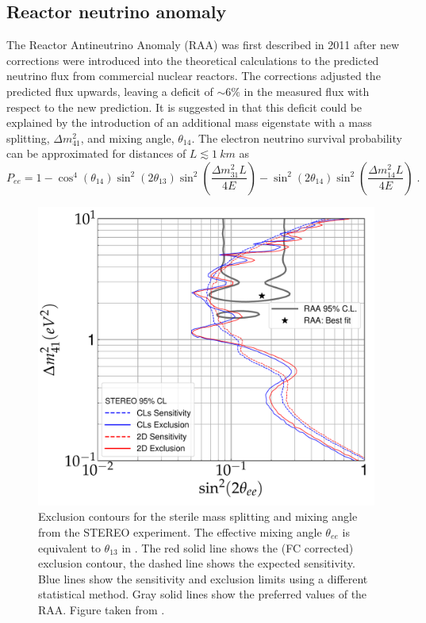 \subsection{Reactor neutrino anomaly}
The Reactor Antineutrino Anomaly (RAA) was first described in 2011 after new corrections were introduced into the theoretical calculations to the predicted neutrino flux from commercial nuclear reactors.
The corrections adjusted the predicted flux upwards, leaving a deficit of $\sim 6\%$ in the measured flux with respect to the new prediction.
It is suggested in \cite{Mention:2011rk} that this deficit could be explained by the introduction of an additional mass eigenstate with a mass splitting, $\Delta m^2_{41}$, and mixing angle, $\theta_{14}$.
The electron neutrino survival probability can be approximated for distances of $L\lesssim \SI{1}{km}$ as
\begin{equation}
    P_{ee} = 1 - \cos^4 (\theta_{14}) \sin^2 (2\theta_{13}) \sin^2 \left(\frac{\Delta m^2_{31} L}{4E} \right) - \sin^2 (2\theta_{14}) \sin^2 \left(\frac{\Delta m^2_{14} L}{4E} \right)\;.\label{eq:approx-Pee}
\end{equation}
\begin{figure}
    \centering
    \includegraphics[width=0.7\linewidth]{figures/theory/STEREO_CLs_2D_5k_Map_nice.pdf}
    \caption{Exclusion contours for the sterile mass splitting and mixing angle from the \textsc{STEREO} experiment. The effective mixing angle $\theta_{ee}$ is equivalent to $\theta_{13}$ in . The red solid line shows the (FC corrected) exclusion contour, the dashed line shows the expected sensitivity. Blue lines show the sensitivity and exclusion limits using a different statistical method. Gray solid lines show the preferred values of the RAA. Figure taken from \cite{STEREO:2022nzk}.\label{fig:sterile-exclusions-stereo}}
\end{figure}
